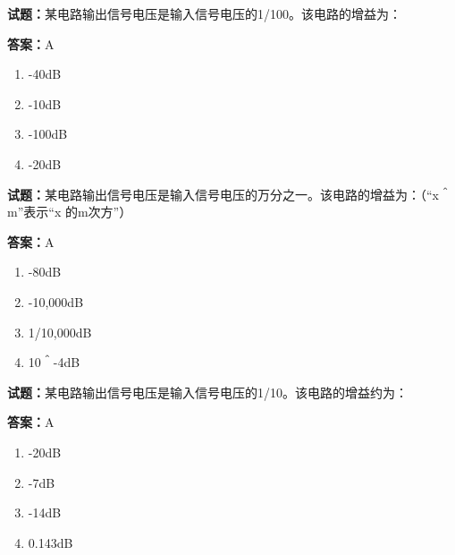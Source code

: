 \documentclass{ctexbook}
\begin{document}




\vspace{1em}

\textbf{试题：}某电路输出信号电压是输入信号电压的1/100。该电路的增益为： 

\textbf{答案：}A 

\begin{enumerate}[leftmargin=3em]
  \item -40dB 

  \item -10dB 

  \item -100dB 

  \item -20dB 

\end{enumerate}





\vspace{1em}

\textbf{试题：}某电路输出信号电压是输入信号电压的万分之一。该电路的增益为：（“x＾m”表示“x
的m次方”） 

\textbf{答案：}A 

\begin{enumerate}[leftmargin=3em]
  \item -80dB 

  \item -10,000dB 

  \item 1/10,000dB 

  \item 10＾-4dB 

\end{enumerate}






\vspace{1em}

\textbf{试题：}某电路输出信号电压是输入信号电压的1/10。该电路的增益约为： 

\textbf{答案：}A 

\begin{enumerate}[leftmargin=3em]
  \item -20dB 

  \item -7dB 

  \item -14dB 

  \item 0.143dB 

\end{enumerate}
\end{document}
